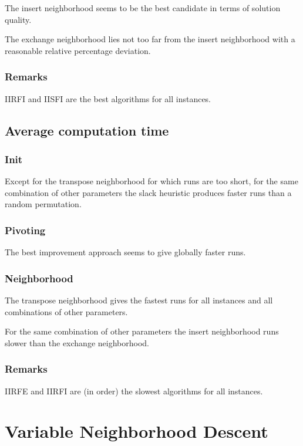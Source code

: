 \documentclass[a4paper,12pt]{article}
\begin{document}
The insert neighborhood seems to be the best candidate in terms of solution quality.

The exchange neighborhood lies not too far from the insert neighborhood with a reasonable relative percentage deviation.



\subsubsection{Remarks}

IIRFI and IISFI are the best algorithms for all instances.
\subsection{Average computation time}


\subsubsection{Init}

Except for the transpose neighborhood for which runs are too short, for the same combination of other parameters the slack heuristic produces faster runs than a random permutation.

\subsubsection{Pivoting}

The best improvement approach seems to give globally faster runs.

\subsubsection{Neighborhood}

The transpose neighborhood gives the fastest runs for all instances and all combinations of other parameters.

For the same combination of other parameters the insert neighborhood runs slower than the exchange neighborhood.


\subsubsection{Remarks}

IIRFE and IIRFI are (in order) the slowest algorithms for all instances.

\newpage\cleardoublepage{}
\section{Variable Neighborhood Descent}
\end{document}
